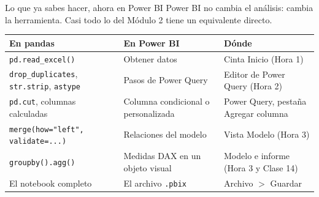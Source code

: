 \documentclass[aspectratio=169,11pt]{beamer}
\begin{document}
\begin{frame}[t]{Lo que ya sabes hacer, ahora en Power BI}
  \small
  Power BI no cambia el análisis: cambia la herramienta. Casi todo lo del
  Módulo 2 tiene un equivalente directo.
  \vspace{0.15cm}

  \renewcommand{\arraystretch}{1.15}
  \footnotesize
  \begin{tabular}{@{}L{3.9cm}L{3.5cm}L{5.6cm}@{}}
    \toprule
    \textbf{En pandas} & \textbf{En Power BI} & \textbf{Dónde} \\
    \midrule
    \texttt{pd.read\_excel()} & Obtener datos & Cinta Inicio (Hora 1) \\
    \texttt{drop\_duplicates}, \texttt{str.strip}, \texttt{astype} & Pasos de Power Query & Editor de Power Query (Hora 2) \\
    \texttt{pd.cut}, columnas calculadas & Columna condicional o personalizada & Power Query, pestaña Agregar columna \\
    \texttt{merge(how="left", validate=...)} & Relaciones del modelo & Vista Modelo (Hora 3) \\
    \texttt{groupby().agg()} & Medidas DAX en un objeto visual & Modelo e informe (Hora 3 y Clase 14) \\
    El notebook completo & El archivo \texttt{.pbix} & Archivo $>$ Guardar \\
    \bottomrule
  \end{tabular}
\end{frame}
\end{document}
